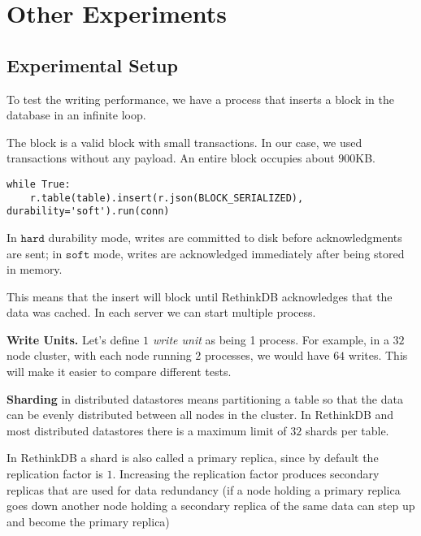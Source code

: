 \section{Other Experiments}\label{appendix:benchmarks}

\subsection{Experimental Setup}\label{subsec:benchmarks_setup}

To test the writing performance, we have a process that inserts a block in the database in an infinite loop.

The block is a valid block with small transactions.
In our case, we used transactions without any payload. 
An entire block occupies about $900$KB.

\begin{minipage}{\linewidth}
  \begin{lstlisting}[style=python]
  while True:
    r.table(table).insert(r.json(BLOCK_SERIALIZED), durability='soft').run(conn)\end{lstlisting}
\end{minipage}

In $\mathtt{hard}$ durability mode, writes are committed to disk before acknowledgments are sent; in $\mathtt{soft}$ mode, writes are acknowledged immediately after being stored in memory.

This means that the insert will block until RethinkDB acknowledges that the data was cached.
In each server we can start multiple process.

\medskip
\noindent\textbf{Write Units.} Let’s define \textit{$1$ write unit} as being 1 process.
For example, in a $32$ node cluster, with each node running $2$ processes, we would have $64$ writes.
This will make it easier to compare different tests.

\medskip
\noindent\textbf{Sharding} in distributed datastores means partitioning a table so that the data can be evenly distributed between all nodes in the cluster.
In RethinkDB and most distributed datastores there is a maximum limit of $32$ shards per table.

In RethinkDB a shard is also called a primary replica, since by default the replication factor is $1$.
Increasing the replication factor produces secondary replicas that are used for data redundancy (if a node holding a primary replica goes down another node holding a secondary replica of the same data can step up and become the primary replica)

